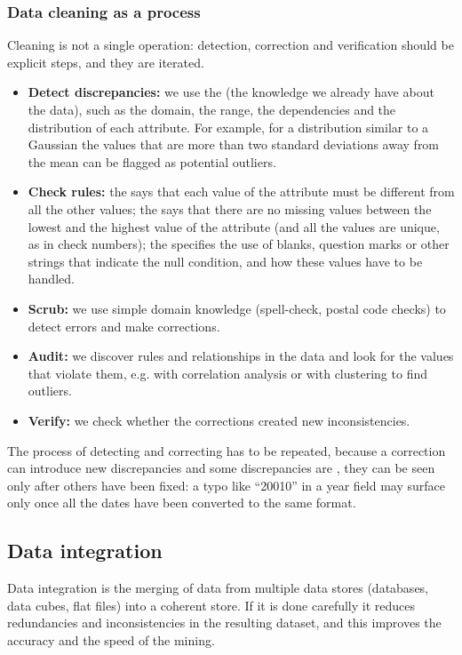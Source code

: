 \subsubsection{Data cleaning as a process}
Cleaning is not a single operation: detection, correction and verification should be explicit steps, and they are iterated.
\begin{itemize}
    \item \textbf{Detect discrepancies:} we use the  (the knowledge we already have about the data), such as the domain, the range, the dependencies and the distribution of each attribute. For example, for a distribution similar to a Gaussian the values that are more than two standard deviations away from the mean can be flagged as potential outliers.
    \item \textbf{Check rules:} the  says that each value of the attribute must be different from all the other values; the  says that there are no missing values between the lowest and the highest value of the attribute (and all the values are unique, as in check numbers); the  specifies the use of blanks, question marks or other strings that indicate the null condition, and how these values have to be handled.
    \item \textbf{Scrub:} we use simple domain knowledge (spell-check, postal code checks) to detect errors and make corrections.
    \item \textbf{Audit:} we discover rules and relationships in the data and look for the values that violate them, e.g. with correlation analysis or with clustering to find outliers.
    \item \textbf{Verify:} we check whether the corrections created new inconsistencies.
\end{itemize}
The process of detecting and correcting has to be repeated, because a correction can introduce new discrepancies and some discrepancies are , they can be seen only after others have been fixed: a typo like ``20010'' in a year field may surface only once all the dates have been converted to the same format.


\subsection{Data integration}
Data integration is the merging of data from multiple data stores (databases, data cubes, flat files) into a coherent store. If it is done carefully it reduces redundancies and inconsistencies in the resulting dataset, and this improves the accuracy and the speed of the mining.

